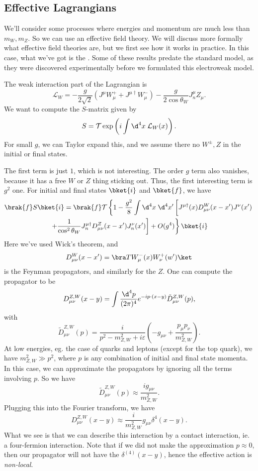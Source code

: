 \documentclass[a4paper]{article}
\begin{document}
\subsection{Effective Lagrangians}
We'll consider some processes where energies and momentum are much less than $m_W, m_Z$. So we can use an effective field theory. We will discuss more formally what effective field theories are, but we first see how it works in practice. In this case, what we've got is the . Some of these results predate the standard model, as they were discovered experimentally before we formulated this electroweak model.

The weak interaction part of the Lagrangian is
\[
  \mathcal{L}_W = -\frac{g}{2\sqrt{2}}(J^\mu W^+_\mu + J^{\mu\dagger}W_\mu^-) - \frac{g}{2 \cos \theta_W} J_n^\mu Z_\mu.
\]
We want to compute the $S$-matrix given by
\[
  S = \mathcal{T} \exp\left(i \int \d^4 x\; \mathcal{L}_W(x)\right).
\]
For small $g$, we can Taylor expand this, and we assume there no $W^{\pm}, Z$ in the initial or final states.

The first term is just $1$, which is not interesting. The order $g$ term also vanishes, because it has a free $W$ or $Z$ thing sticking out. Thus, the first interesting term is $g^2$ one. For initial and final states $\bket{i}$ and $\bket{f}$, we have
\begin{multline*}
  \brak{f}S\bket{i} = \brak{f} \mathcal{T} \left\{ 1 - \frac{g^2}{8} \int \d^4 x\; \d^4 x'\left[J^{\mu\dagger}(x) D_{\mu\nu}^W (x - x') J^\nu(x') \vphantom{\frac{1}{\cos^2 \theta_W}}\right.\right. \\
  \left.\left.+ \frac{1}{\cos^2 \theta_W} J_n^{\mu\dagger} D_{\mu\nu}^Z (x - x') J_n^\nu(x')\right] + O(g^4)\right\}\bket{i}
\end{multline*}
Here we've used Wick's theorem, and
\[
  D_{\mu\nu}^W (x - x') = \bra T W_\mu^-(x) W_\nu^+(w')\ket
\]
is the Feynman propagators, and similarly for the $Z$. One can compute the propagator to be
\[
  D_{\mu\nu}^{Z, W} (x - y) = \int \frac{\d^4 p}{(2\pi)^4} e^{-ip\cdot (x - y)} \tilde{D}_{\mu\nu}^{Z, W}(p),
\]
with
\[
  \tilde{D}_{\mu\nu}^{Z, W} (p) = \frac{i}{p^2 - m_{Z, W}^2 + i \varepsilon}\left(-g_{\mu\nu} + \frac{p_\mu p_\nu}{m^2_{Z, W}}\right). %
\]
At low energies, eg. the case of quarks and leptons (except for the top quark), we have $m^2_{Z, W} \gg p^2$, where $p$ is any combination of initial and final state momenta. In this case, we can approximate the propagators by ignoring all the terms involving $p$. So we have
\[
  \tilde{D}^{Z, W}_{\mu\nu}(p) \approx \frac{i g_{\mu\nu}}{m_{Z, W}^2}.
\]
Plugging this into the Fourier transform, we have
\[
  D_{\mu\nu}^{Z, W}(x - y) \approx \frac{i}{m^2_{Z, W}}g_{\mu\nu} \delta^4(x - y).
\]
What we see is that we can describe this interaction by a contact interaction, ie. a four-fermion interaction. Note that if we did not make the approximation $p \approx 0$, then our propagator will not have the $\delta^{(4)}(x - y)$, hence the effective action is \emph{non-local}.
\end{document}
